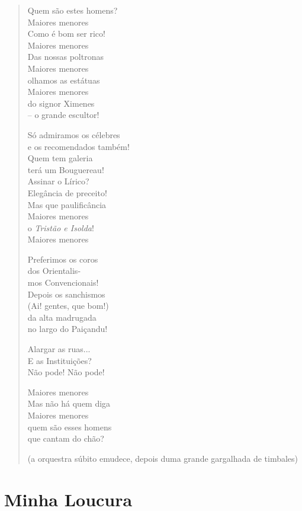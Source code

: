 \begin{verse}
Quem são estes homens?\\
Maiores menores\\
Como é bom ser rico!\\
Maiores menores\\
Das nossas poltronas\\
Maiores menores\\
olhamos as estátuas\\
Maiores menores\\
do signor Ximenes\\
-- o grande escultor!

Só admiramos os célebres\\
e os recomendados também!\\
Quem tem galeria\\
terá um Bouguereau!\\
Assinar o Lírico?\\
Elegância de preceito!\\
Mas que paulificância\\
Maiores menores\\
o \emph{Tristão e Isolda}!\\
Maiores menores

Preferimos os coros\\
dos Orientalis-\\
mos Convencionais!\\
Depois os sanchismos\\
(Ai! gentes, que bom!)\\
da alta madrugada\\
no largo do Paiçandu!

Alargar as ruas...\\
E as Instituições?\\
Não pode! Não pode!

Maiores menores\\
Mas não há quem diga\\
Maiores menores\\
quem são esses homens\\
que cantam do chão?

\hfill{}(a orquestra súbito emudece, depois duma grande gargalhada de timbales)
\end{verse}

\section*{Minha Loucura}

